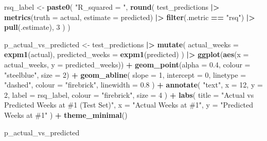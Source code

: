 \documentclass[
]{article}
\newenvironment{Shaded}{\begin{snugshade}}{\end{snugshade}}
\newcommand{\AttributeTok}[1]{\textcolor[rgb]{0.13,0.29,0.53}{#1}}
\newcommand{\DecValTok}[1]{\textcolor[rgb]{0.00,0.00,0.81}{#1}}
\newcommand{\FloatTok}[1]{\textcolor[rgb]{0.00,0.00,0.81}{#1}}
\newcommand{\FunctionTok}[1]{\textcolor[rgb]{0.13,0.29,0.53}{\textbf{#1}}}
\newcommand{\NormalTok}[1]{#1}
\newcommand{\OtherTok}[1]{\textcolor[rgb]{0.56,0.35,0.01}{#1}}
\newcommand{\SpecialCharTok}[1]{\textcolor[rgb]{0.81,0.36,0.00}{\textbf{#1}}}
\newcommand{\StringTok}[1]{\textcolor[rgb]{0.31,0.60,0.02}{#1}}
\begin{document}
\begin{Shaded}
\begin{Highlighting}[]
\NormalTok{rsq\_label }\OtherTok{\textless{}{-}} \FunctionTok{paste0}\NormalTok{(}
  \StringTok{"R\_squared = "}\NormalTok{,}
  \FunctionTok{round}\NormalTok{(}
\NormalTok{    test\_predictions }\SpecialCharTok{|\textgreater{}}
      \FunctionTok{metrics}\NormalTok{(}\AttributeTok{truth =}\NormalTok{ actual, }\AttributeTok{estimate =}\NormalTok{ predicted) }\SpecialCharTok{|\textgreater{}}
      \FunctionTok{filter}\NormalTok{(.metric }\SpecialCharTok{==} \StringTok{"rsq"}\NormalTok{) }\SpecialCharTok{|\textgreater{}}
      \FunctionTok{pull}\NormalTok{(.estimate),}
    \DecValTok{3}
\NormalTok{  )}
\NormalTok{)}

\NormalTok{p\_actual\_vs\_predicted }\OtherTok{\textless{}{-}}\NormalTok{ test\_predictions }\SpecialCharTok{|\textgreater{}}
  \FunctionTok{mutate}\NormalTok{(}
    \AttributeTok{actual\_weeks    =} \FunctionTok{expm1}\NormalTok{(actual),}
    \AttributeTok{predicted\_weeks =} \FunctionTok{expm1}\NormalTok{(predicted)}
\NormalTok{  ) }\SpecialCharTok{|\textgreater{}}
  \FunctionTok{ggplot}\NormalTok{(}\FunctionTok{aes}\NormalTok{(}\AttributeTok{x =}\NormalTok{ actual\_weeks, }\AttributeTok{y =}\NormalTok{ predicted\_weeks)) }\SpecialCharTok{+}
  \FunctionTok{geom\_point}\NormalTok{(}\AttributeTok{alpha =} \FloatTok{0.4}\NormalTok{, }\AttributeTok{colour =} \StringTok{"steelblue"}\NormalTok{, }\AttributeTok{size =} \DecValTok{2}\NormalTok{) }\SpecialCharTok{+}
  \FunctionTok{geom\_abline}\NormalTok{(}
    \AttributeTok{slope     =} \DecValTok{1}\NormalTok{,}
    \AttributeTok{intercept =} \DecValTok{0}\NormalTok{,}
    \AttributeTok{linetype  =} \StringTok{"dashed"}\NormalTok{,}
    \AttributeTok{colour    =} \StringTok{"firebrick"}\NormalTok{,}
    \AttributeTok{linewidth =} \FloatTok{0.8}
\NormalTok{  ) }\SpecialCharTok{+}
  \FunctionTok{annotate}\NormalTok{(}
    \StringTok{"text"}\NormalTok{,}
    \AttributeTok{x      =} \DecValTok{12}\NormalTok{,}
    \AttributeTok{y      =} \DecValTok{2}\NormalTok{,}
    \AttributeTok{label  =}\NormalTok{ rsq\_label, }
    \AttributeTok{colour =} \StringTok{"firebrick"}\NormalTok{,}
    \AttributeTok{size   =} \DecValTok{4}
\NormalTok{  ) }\SpecialCharTok{+}
  \FunctionTok{labs}\NormalTok{(}
    \AttributeTok{title    =} \StringTok{"Actual vs Predicted Weeks at \#1 (Test Set)"}\NormalTok{,}
    \AttributeTok{x        =} \StringTok{"Actual Weeks at \#1"}\NormalTok{,}
    \AttributeTok{y        =} \StringTok{"Predicted Weeks at \#1"}
\NormalTok{  ) }\SpecialCharTok{+}
  \FunctionTok{theme\_minimal}\NormalTok{()}

\NormalTok{p\_actual\_vs\_predicted}
\end{Highlighting}
\end{Shaded}
\end{document}
